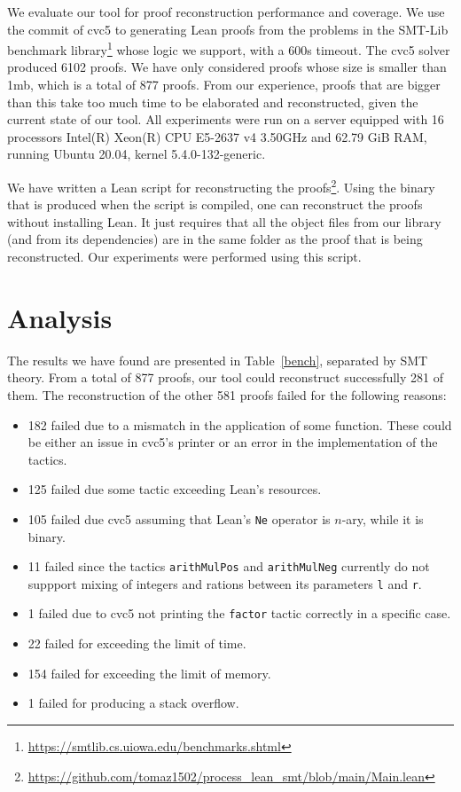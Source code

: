 
We evaluate our tool for proof reconstruction performance and coverage. We use the commit
 of cvc5 to generating Lean proofs from the
problems in the SMT-Lib benchmark library\footnote{\url{https://smtlib.cs.uiowa.edu/benchmarks.shtml}} whose
logic we support, with a 600s timeout. The cvc5 solver produced 6102
proofs. We have only considered proofs whose size is smaller than
1mb, which is a total of 877 proofs. From our experience, proofs that are
bigger than this take too much time to be elaborated and reconstructed,
given the current state of our tool.
All experiments were run on a server
equipped with 16 processors Intel(R) Xeon(R) CPU E5-2637 v4 3.50GHz and
62.79 GiB RAM, running Ubuntu 20.04, kernel 5.4.0-132-generic.

We have written a Lean script for reconstructing the proofs\footnote{\url{https://github.com/tomaz1502/process_lean_smt/blob/main/Main.lean}}. Using the binary that is produced when the script is compiled, one can reconstruct the proofs without installing Lean.
It just requires that all the object files from our library (and from its dependencies) are in the same folder as the proof that is being reconstructed.
Our experiments were performed using this script.

\section{Analysis}

The results we have found are presented in Table~\ref{bench}, separated
by SMT theory. From a total of 877 proofs, our tool could reconstruct
successfully 281 of them. The reconstruction of the other 581 proofs
failed for the following reasons:

\begin{itemize}
  \item 182 failed due to a mismatch in the application of some function. These could be either an issue in cvc5's printer or an error in the implementation of the tactics.
  \item 125 failed due some tactic exceeding Lean's resources.
  \item 105 failed due cvc5 assuming that Lean's \texttt{Ne} operator is $n$-ary, while it is binary.
  \item 11 failed since the tactics \texttt{arithMulPos} and \texttt{arithMulNeg} currently do not suppport mixing of integers and rations between its parameters \texttt{l} and \texttt{r}.
  \item 1 failed due to cvc5 not printing the \texttt{factor} tactic correctly in a specific case.
  \item 22 failed for exceeding the limit of time.
  \item 154 failed for exceeding the limit of memory.
  \item 1 failed for producing a stack overflow.
\end{itemize}




